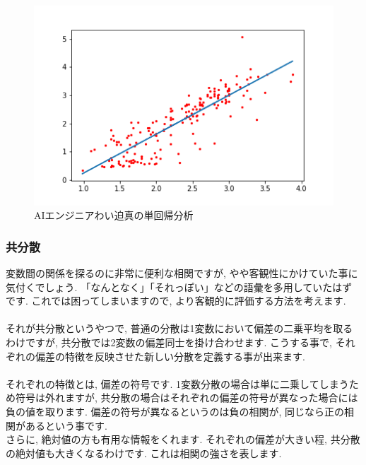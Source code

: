 \documentclass[11pt,a4paper]{jreport}
\begin{document}
\begin{figure}[H]
\label{im:predict}
  \centering
  \includegraphics[width=120mm,bb=0 0 432 288]{figures/predict.png}
  \caption{AIエンジニアわい迫真の単回帰分析}
\end{figure}

\subsubsection{共分散}
変数間の関係を探るのに非常に便利な相関ですが, やや客観性にかけていた事に気付くでしょう. 「なんとなく」「それっぽい」などの語彙を多用していたはずです. これでは困ってしまいますので, より客観的に評価する方法を考えます.\\
\\
それが共分散というやつで, 普通の分散は1変数において偏差の二乗平均を取るわけですが, 共分散では2変数の偏差同士を掛け合わせます. こうする事で, それぞれの偏差の特徴を反映させた新しい分散を定義する事が出来ます. \\
\\
それぞれの特徴とは, 偏差の符号です. 1変数分散の場合は単に二乗してしまうため符号は外れますが, 共分散の場合はそれぞれの偏差の符号が異なった場合には負の値を取ります. 偏差の符号が異なるというのは負の相関が, 同じなら正の相関があるという事です.\\
さらに, 絶対値の方も有用な情報をくれます. それぞれの偏差が大きい程, 共分散の絶対値も大きくなるわけです. これは相関の強さを表します.\\
\end{document}

